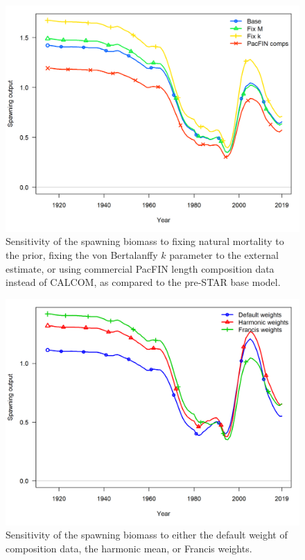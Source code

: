 \documentclass[12pt,]{article}
\begin{document}
\FloatBarrier

\begin{figure}
\centering
\includegraphics{Figures/sensitivity1_spawnbio.png}
\caption{Sensitivity of the spawning biomass to fixing natural mortality
to the prior, fixing the von Bertalanffy \(k\) parameter to the external
estimate, or using commercial PacFIN length composition data instead of
CALCOM, as compared to the pre-STAR base model.
\label{fig:sensitivity1_spawnbio}}
\end{figure}

\begin{figure}
\centering
\includegraphics{Figures/sensitivity2_spawnbio.png}
\caption{Sensitivity of the spawning biomass to either the default
weight of composition data, the harmonic mean, or Francis weights.
\label{fig:sensitivity2_spawnbio}}
\end{figure}
\end{document}
